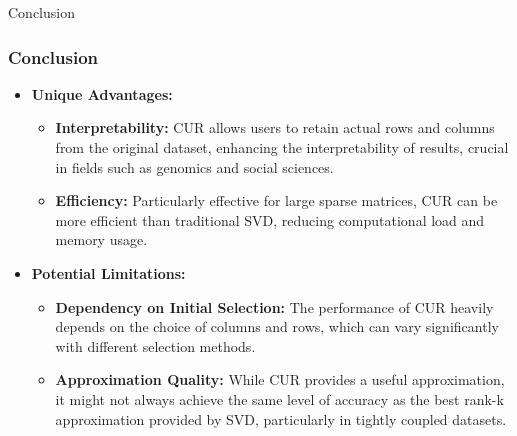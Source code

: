 \documentclass[pdf]{beamer}
\begin{document}
\begin{frame}{Conclusion}
    \frametitle{Conclusion}
    \begin{itemize}
        \item \textbf{Unique Advantages:}
            \begin{itemize}
                \item \textbf{Interpretability:} CUR allows users to retain actual rows and columns from the original dataset, enhancing the interpretability of results, crucial in fields such as genomics and social sciences.
                \item \textbf{Efficiency:} Particularly effective for large sparse matrices, CUR can be more efficient than traditional SVD, reducing computational load and memory usage.
            \end{itemize}
        \item \textbf{Potential Limitations:}
            \begin{itemize}
                \item \textbf{Dependency on Initial Selection:} The performance of CUR heavily depends on the choice of columns and rows, which can vary significantly with different selection methods.
                \item \textbf{Approximation Quality:} While CUR provides a useful approximation, it might not always achieve the same level of accuracy as the best rank-k approximation provided by SVD, particularly in tightly coupled datasets.
            \end{itemize}
    \end{itemize}
\end{frame}
\end{document}

